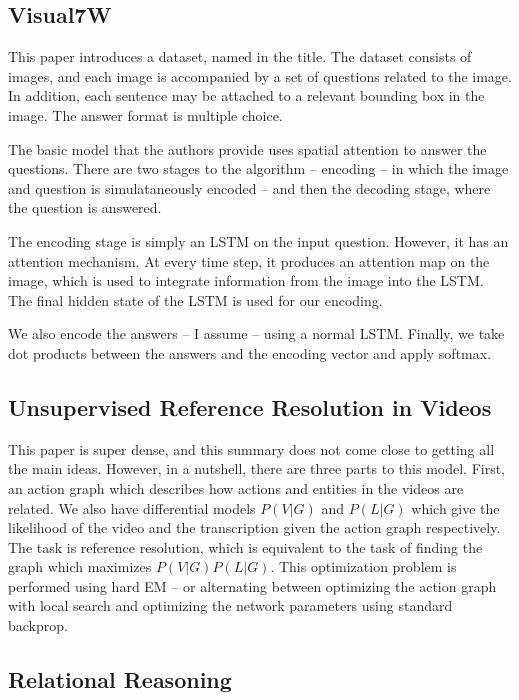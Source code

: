 \documentclass[12pt]{article}
\begin{document}
\subsection{Visual7W \cite{Visual7W}}

This paper introduces a dataset, named in the title. The dataset consists of images, and each image is accompanied by a set of questions related to the image. In addition, each sentence may be attached to a relevant bounding box in the image. The answer format is multiple choice.

The basic model that the authors provide uses spatial attention to answer the questions. There are two stages to the algorithm -- encoding -- in which the image and question is simulataneously encoded -- and then the decoding stage, where the question is answered.

The encoding stage is simply an LSTM on the input question. However, it has an attention mechanism. At every time step, it produces an attention map on the image, which is used to integrate information from the image into the LSTM. The final hidden state of the LSTM is used for our encoding.

We also encode the answers -- I assume -- using a normal LSTM. Finally, we take dot products between the answers and the encoding vector and apply softmax.

\subsection{Unsupervised Reference Resolution in Videos \cite{ReferenceInVideos}}

This paper is super dense, and this summary does not come close to getting all the main ideas. However, in a nutshell, there are three parts to this model. First, an action graph which describes how actions and entities in the videos are related. We also have differential models $P(V|G)$ and $P(L|G)$ which give the likelihood of the video and the transcription given the action graph respectively. The task is reference resolution, which is equivalent to the task of finding the graph which maximizes $P(V|G)P(L|G)$. This optimization problem is performed using hard EM -- or alternating between optimizing the action graph with local search and optimizing the network parameters using standard backprop. 

\subsection{Relational Reasoning \cite{RelationalReasoning}}
\end{document}
